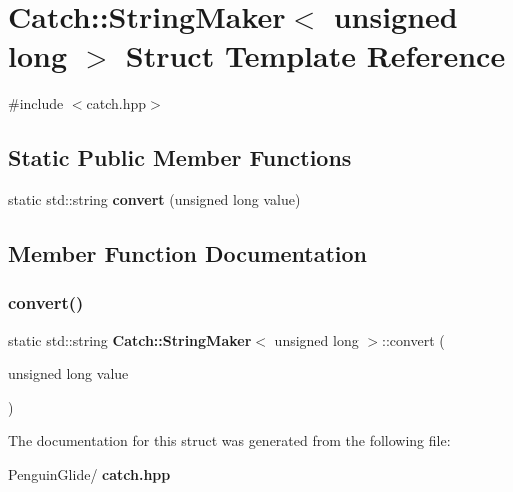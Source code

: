 \section{Catch\+::String\+Maker$<$ unsigned long $>$ Struct Template Reference}
\label{struct_catch_1_1_string_maker_3_01unsigned_01long_01_4}


{\ttfamily \#include $<$catch.\+hpp$>$}

\subsection*{Static Public Member Functions}
\begin{DoxyCompactItemize}
\item 
static std\+::string \textbf{ convert} (unsigned long value)
\end{DoxyCompactItemize}


\subsection{Member Function Documentation}
\mbox{\label{struct_catch_1_1_string_maker_3_01unsigned_01long_01_4_ae105dc97e4462a86a61b59667f8423c9}} 
\subsubsection{convert()}
{\footnotesize\ttfamily static std\+::string \textbf{ Catch\+::\+String\+Maker}$<$ unsigned long $>$\+::convert (\begin{DoxyParamCaption}\item[{unsigned long}]{value }\end{DoxyParamCaption})\hspace{0.3cm}{\ttfamily [static]}}



The documentation for this struct was generated from the following file\+:\begin{DoxyCompactItemize}
\item 
Penguin\+Glide/\textbf{ catch.\+hpp}\end{DoxyCompactItemize}

